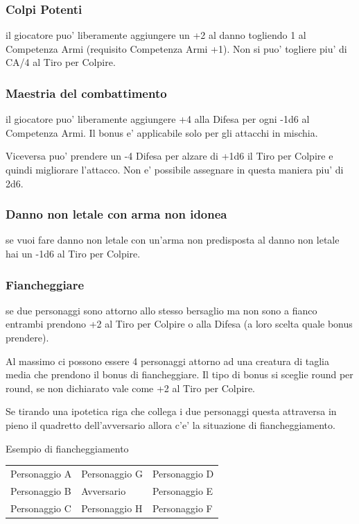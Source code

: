 \documentclass[a4paper,11pt,twoside,openany]{book}
\begin{document}
	\subsubsection{Colpi Potenti} il giocatore puo' liberamente aggiungere un +2 al danno togliendo 1 al Competenza Armi (requisito Competenza Armi +1). Non si puo' togliere piu' di CA/4 al Tiro per Colpire.
	
	\subsubsection{Maestria del combattimento} il giocatore puo' liberamente aggiungere +4 alla Difesa per ogni -1d6 al Competenza Armi. Il bonus e' applicabile solo per gli attacchi in mischia.
	
	Viceversa puo' prendere un -4 Difesa per alzare di +1d6 il Tiro per Colpire e quindi migliorare l'attacco. Non e' possibile assegnare in questa maniera piu' di 2d6.
	
	\subsubsection{Danno non letale con arma non idonea} se vuoi fare danno non letale con un'arma non predisposta al danno non letale hai un -1d6 al Tiro per Colpire.
	
	\subsubsection{Fiancheggiare} se due personaggi sono attorno allo stesso bersaglio ma non sono a fianco entrambi prendono +2 al Tiro per Colpire o alla Difesa (a loro scelta quale bonus prendere).
	
	Al massimo ci possono essere 4 personaggi attorno ad una creatura di taglia media che prendono il bonus di fiancheggiare. Il tipo di bonus si sceglie round per round, se non dichiarato vale come +2 al Tiro per Colpire.
	
	Se tirando una ipotetica riga che collega i due personaggi questa attraversa in pieno il quadretto dell'avversario allora c'e' la situazione di fiancheggiamento.
	
	\bigskip
	
	Esempio di fiancheggiamento
	\medskip
	\begin{longtable}{L{3cm} k{3cm} k{3cm}}
		\toprule
		Personaggio A & Personaggio G & Personaggio D\tabularnewline
		Personaggio B & Avversario & Personaggio E\tabularnewline
		Personaggio C & Personaggio H & Personaggio F\tabularnewline
	\end{longtable}
	
\end{document}
